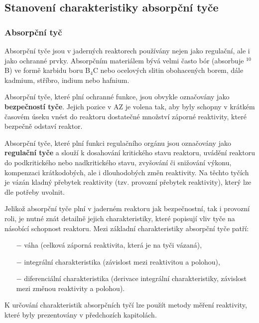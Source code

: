 \subsection{Stanovení charakteristiky absorpční tyče}

\subsubsection{Absorpční tyč}

Absorpční tyče jsou v jaderných reaktorech používány nejen jako regulační, ale i jako ochranné prvky. Absorpčním materiálem bývá velmi často bór (absorbuje $^{10}$B) ve formě karbidu boru B$_4$C nebo ocelových slitin obohacených borem, dále kadmium, stříbro, indium nebo hafnium. 

Absorpční tyče, které plní ochranné funkce, jsou obvykle označovány jako \textbf{bezpečností tyče}. Jejich pozice v AZ je volena tak, aby byly schopny v krátkém časovém úseku vnést do reaktoru dostatečné množství záporné reaktivity, které bezpečně odstaví reaktor. 

Absorpční tyče, které plní funkci regulačního orgánu jsou označovány jako \textbf{regulační tyče} a slouží k dosahování kritického stavu reaktoru, uvádění reaktoru do podkritického nebo nadkritického stavu, zvyšování či snižování výkonu, kompenzaci krátkodobých, ale i dlouhodobých změn reaktivity. Na těchto tyčích je vázán kladný přebytek reaktivity (tzv. provozní přebytek reaktivity), který lze dle potřeby uvolnit.

Jelikož absorpční tyče plní v jaderném reaktoru jak bezpečnostní, tak i provozní roli, je nutné znát detailně jejich charakteristiky, které popisují vliv tyče na násobící schopnost reaktoru. Mezi základní charakteristiky absorpční tyče patří:

\begin{itemize}
    \item[$-$] váha (celková záporná reaktivita, která je na tyči vázaná),
    \item[$-$] integrální charakteristika (závislost mezi reaktivitou a polohou),
    \item[$-$] diferenciální charakteristika (derivace integrální charakteristiky, závislost mezi změnou reaktivity a polohou).
\end{itemize}

K určování charakteristik absorpčních tyčí lze použít metody měření reaktivity, které byly prezentovány v předchozích kapitolách. 


